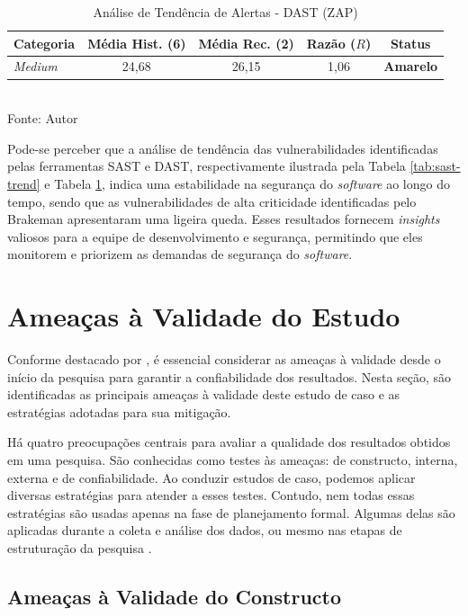 \begin{table}[h]
    \centering
    \caption{Análise de Tendência de Alertas - DAST (ZAP)}
    \label{tab:dast-trend}
    \begin{tabular}{lcccc}
        \toprule
        \textbf{Categoria} & \textbf{Média Hist. (6)} & \textbf{Média Rec. (2)} & \textbf{Razão ($R$)} & \textbf{Status} \\
        \midrule
        \textit{Medium} & 24,68 & 26,15 & 1,06 & \textcolor{yellow!80!black}{\textbf{Amarelo}} \\
        \bottomrule
    \end{tabular}
    \small{\\ Fonte: Autor}
\end{table}

Pode-se perceber que a análise de tendência das vulnerabilidades identificadas pelas ferramentas SAST e DAST, respectivamente ilustrada pela Tabela \ref{tab:sast-trend} e Tabela \ref{tab:dast-trend}, indica uma estabilidade na segurança do \textit{software} ao longo do tempo, sendo que as vulnerabilidades de alta criticidade identificadas pelo Brakeman apresentaram uma ligeira queda. Esses resultados fornecem \textit{insights} valiosos para a equipe de desenvolvimento e segurança, permitindo que eles monitorem e priorizem as demandas de segurança do \textit{software}.

\section{Ameaças à Validade do Estudo}

Conforme destacado por , é essencial considerar as ameaças à validade desde o início da pesquisa para garantir a confiabilidade dos resultados. Nesta seção, são identificadas as principais ameaças à validade deste estudo de caso e as estratégias adotadas para sua mitigação.

Há quatro preocupações centrais para avaliar a qualidade dos resultados obtidos em uma pesquisa. São conhecidas como testes às ameaças: de constructo, interna, externa e de confiabilidade. Ao conduzir estudos de caso, podemos aplicar diversas estratégias para atender a esses testes. Contudo, nem todas essas estratégias são usadas apenas na fase de planejamento formal. Algumas delas são aplicadas durante a coleta e análise dos dados, ou mesmo nas etapas de estruturação da pesquisa \cite{yin2015estudo}.

\subsection{Ameaças à Validade do Constructo}

